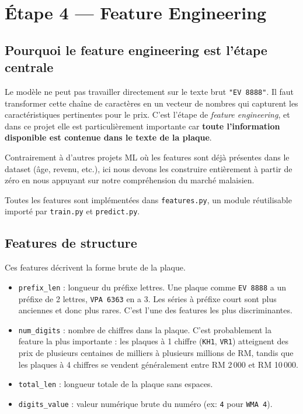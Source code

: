 \documentclass[12pt, a4paper]{article}
\begin{document}
\section{Étape 4 — Feature Engineering}

\subsection{Pourquoi le feature engineering est l'étape centrale}

Le modèle ne peut pas travailler directement sur le texte brut \texttt{"EV 8888"}. Il faut transformer cette chaîne de caractères en un vecteur de nombres qui capturent les caractéristiques pertinentes pour le prix. C'est l'étape de \textit{feature engineering}, et dans ce projet elle est particulièrement importante car \textbf{toute l'information disponible est contenue dans le texte de la plaque}.

Contrairement à d'autres projets ML où les features sont déjà présentes dans le dataset (âge, revenu, etc.), ici nous devons les construire entièrement à partir de zéro en nous appuyant sur notre compréhension du marché malaisien.

Toutes les features sont implémentées dans \texttt{features.py}, un module réutilisable importé par \texttt{train.py} et \texttt{predict.py}.

\subsection{Features de structure}

Ces features décrivent la forme brute de la plaque.

\begin{itemize}
  \item \texttt{prefix\_len} : longueur du préfixe lettres. Une plaque comme \texttt{EV 8888} a un préfixe de 2 lettres, \texttt{VPA 6363} en a 3. Les séries à préfixe court sont plus anciennes et donc plus rares. C'est l'une des features les plus discriminantes.
  \item \texttt{num\_digits} : nombre de chiffres dans la plaque. C'est probablement la feature la plus importante : les plaques à 1 chiffre (\texttt{KH1}, \texttt{VR1}) atteignent des prix de plusieurs centaines de milliers à plusieurs millions de RM, tandis que les plaques à 4 chiffres se vendent généralement entre RM 2\,000 et RM 10\,000.
  \item \texttt{total\_len} : longueur totale de la plaque sans espaces.
  \item \texttt{digits\_value} : valeur numérique brute du numéro (ex: \texttt{4} pour \texttt{WMA 4}).
\end{itemize}
\end{document}
